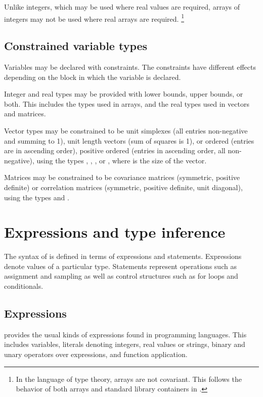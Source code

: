 \documentclass[article]{jss}
\begin{document}
Unlike integers, which may be used where real values are required,
arrays of integers may not be used where real arrays are required.%
%
\footnote{In the language of type theory,  arrays are
  not covariant.  This follows the behavior of both arrays and
  standard library containers in .}

\subsection{Constrained variable types}

Variables may be declared with constraints.  The constraints have
different effects depending on the block in which the variable is
declared.

Integer and real types may be provided with lower bounds, upper
bounds, or both.  This includes the types used in arrays, and the real
types used in vectors and matrices.

Vector types may be constrained to be unit simplexes (all entries
non-negative and summing to 1), unit length vectors (sum of squares is 1), or
ordered (entries are in ascending order), positive ordered (entries in
ascending order, all non-negative), using the types ,
, , or
, where  is the size of the vector.

Matrices may be constrained to be covariance matrices (symmetric,
positive definite) or correlation matrices (symmetric, positive
definite, unit diagonal), using the types  and
.

\section{Expressions and type inference}

The syntax of  is defined in terms of expressions and
statements.  Expressions denote values of a particular type.  
Statements represent operations such as assignment and sampling as
well as control structures such as for loops and conditionals.

\subsection{Expressions}

 provides the usual kinds of expressions found in
programming languages.  This includes variables, literals denoting
integers, real values or strings, binary and unary operators over
expressions, and function application.  
\end{document}
